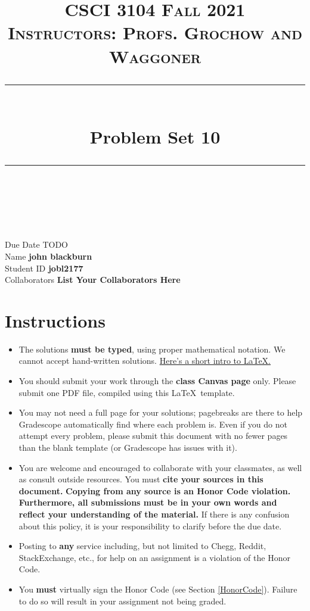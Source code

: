 \documentclass[11pt]{article}
\title{
\normalfont \normalsize 
\textsc{CSCI 3104 Fall 2021 \\ 
Instructors: Profs. Grochow and Waggoner} \\
[10pt] 
\rule{\linewidth}{0.5pt} \\[6pt] 
\huge Problem Set 10 \\
\rule{\linewidth}{2pt}  \\[10pt]
}
\date{}
\theoremstyle{definition}
\theoremstyle{definition}
\theoremstyle{definition}
\begin{document}
\maketitle


\noindent
Due Date \dotfill TODO \\
Name \dotfill \textbf{john blackburn} \\
Student ID \dotfill \textbf{jobl2177} \\
Collaborators \dotfill \textbf{List Your Collaborators Here}

\tableofcontents

\section{Instructions}
 \begin{itemize}
	\item The solutions \textbf{must be typed}, using proper mathematical notation. We cannot accept hand-written solutions. \href{http://ece.uprm.edu/~caceros/latex/introduction.pdf}{Here's a short intro to \LaTeX.}
	\item You should submit your work through the \textbf{class Canvas page} only. Please submit one PDF file, compiled using this \LaTeX \ template.
	\item You may not need a full page for your solutions; pagebreaks are there to help Gradescope automatically find where each problem is. Even if you do not attempt every problem, please submit this document with no fewer pages than the blank template (or Gradescope has issues with it).

	\item You are welcome and encouraged to collaborate with your classmates, as well as consult outside resources. You must \textbf{cite your sources in this document.} \textbf{Copying from any source is an Honor Code violation. Furthermore, all submissions must be in your own words and reflect your understanding of the material.} If there is any confusion about this policy, it is your responsibility to clarify before the due date. 

	\item Posting to \textbf{any} service including, but not limited to Chegg, Reddit, StackExchange, etc., for help on an assignment is a violation of the Honor Code.

	\item You \textbf{must} virtually sign the Honor Code (see Section \ref{HonorCode}). Failure to do so will result in your assignment not being graded.
\end{itemize}
\end{document}
